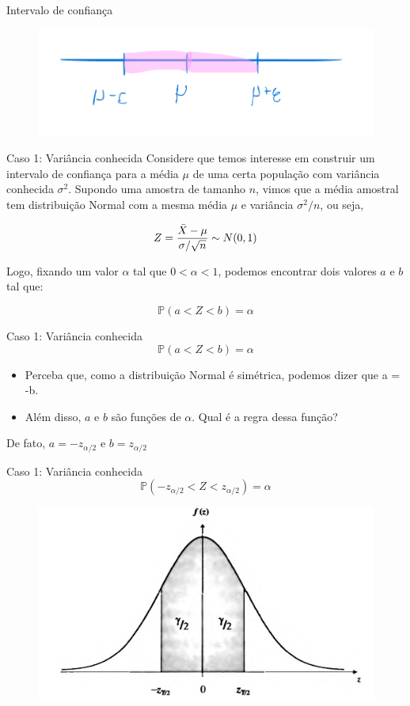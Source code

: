 \begin{frame}{Intervalo de confiança}
    \begin{figure}
        \centering
        \includegraphics[width=0.8\linewidth]{figures/confidence_interval.png}
    \end{figure}
\end{frame}


\begin{frame}{Caso 1: Variância conhecida}
    Considere que temos interesse em construir um intervalo de confiança para a média $\mu$ de uma certa população com variância conhecida $\sigma^2$. Supondo uma amostra de tamanho $n$, vimos que a média amostral tem distribuição Normal com a mesma média $\mu$ e variância $\sigma^2/n$, ou seja, 

    $$Z =\dfrac{\Bar{X} - \mu}{\sigma/\sqrt{n}} \sim N(0,1)$$

    \pause

    Logo, fixando um valor $\alpha$ tal que $0<\alpha<1$, podemos encontrar dois valores $a$ e $b$ tal que:

    $$\mathds{P}(a <Z < b) = \alpha$$
\end{frame}

\begin{frame}{Caso 1: Variância conhecida}
    $$\mathds{P}(a <Z < b) = \alpha$$

    \begin{itemize}
        \item Perceba que, como a distribuição Normal é simétrica, podemos dizer que a = -b.
        \item Além disso, $a$ e $b$ são funções de $\alpha$. Qual é a regra dessa função?
    \end{itemize}
    \pause

    De fato, $a=-z_{\alpha/2}$ e $b = z_{\alpha/2}$
   
\end{frame}

\begin{frame}{Caso 1: Variância conhecida}
    $$\mathds{P}(-z_{\alpha/2} <Z < z_{\alpha/2}) = \alpha$$

    \begin{figure}
        \centering
        \includegraphics[width=0.6\linewidth]{figures/confidence_interval_2.png}
    \end{figure}
\end{frame}

